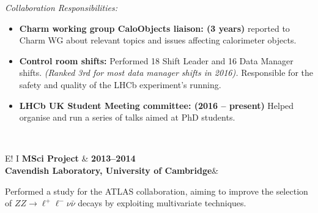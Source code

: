 \documentclass[11pt,a4paper]{article}
\newcommand\VRule{\color{lightgray}\vrule width 0.5pt}
\begin{document}
\noindent\emph{Collaboration Responsibilities:} 
\begin{itemize}
\setlength\itemsep{0em}
\item {\bf Charm working group CaloObjects liaison: (3 years)} reported to Charm WG about relevant topics and issues affecting calorimeter objects.  

\item {\bf Control room shifts:} Performed 18 Shift Leader and 16 Data Manager shifts. \emph{(Ranked 3rd for most data manager shifts in 2016).} Responsible for the safety and quality of the LHCb experiment's running.
\item {\bf LHCb UK Student Meeting committee: (2016 -- present)} Helped organise and run a series of talks aimed at PhD students.
\end{itemize}
~ 

\noindent\begin{tabular}{E!{\VRule} I }
{\bf MSci Project}   & {\bf2013--2014}\\
{\bf Cavendish Laboratory, University of Cambridge}&\\
\end{tabular}

Performed a study for the ATLAS collaboration, aiming to improve the selection of $ZZ \to \ell^{+}\ell^{-} \nu \bar{\nu}$ decays by exploiting multivariate techniques.\\
\end{document}
